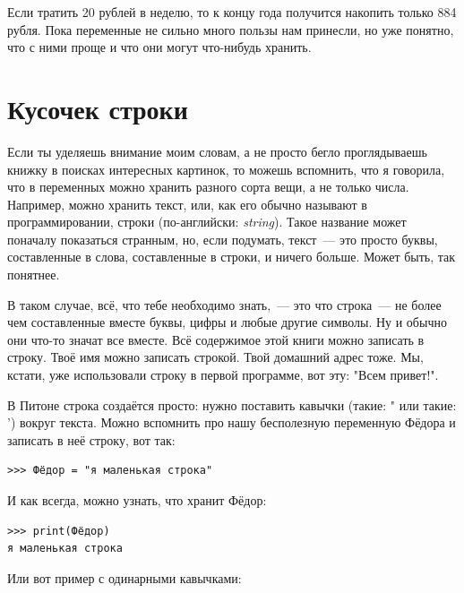 Если тратить 20 рублей в неделю, то к концу года получится накопить только 884 рубля. Пока переменные не сильно много пользы нам принесли, но уже понятно, что с ними проще и что они могут что-нибудь хранить.


\section{Кусочек строки}

Если ты уделяешь внимание моим словам, а не просто бегло проглядываешь книжку в поисках интересных картинок, то можешь вспомнить, что я говорила, что в переменных можно хранить разного сорта вещи, а не только числа. Например, можно хранить текст, или, как его обычно называют в программировании, строки (по-английски: \emph{string}). Такое название может поначалу показаться странным, но, если подумать, текст — это просто буквы, составленные в слова, составленные в строки, и ничего больше. Может быть, так понятнее.


В таком случае, всё, что тебе необходимо знать, — это что строка — не более чем составленные вместе буквы, цифры и любые другие символы. Ну и обычно они что-то значат все вместе. Всё содержимое этой книги можно записать в строку. Твоё имя можно записать строкой. Твой домашний адрес тоже. Мы, кстати, уже использовали строку в первой программе, вот эту: "Всем привет!".

В Питоне строка создаётся просто: нужно поставить кавычки (такие: " или такие: ') вокруг текста. Можно вспомнить про нашу бесполезную переменную Фёдора и записать в неё строку, вот так:

\begin{listing}
\begin{verbatim}
>>> Фёдор = "я маленькая строка"
\end{verbatim}
\end{listing}

И как всегда, можно узнать, что хранит Фёдор:

\begin{listing}
\begin{verbatim}
>>> print(Фёдор)
я маленькая строка
\end{verbatim}
\end{listing}

Или вот пример с одинарными кавычками:

